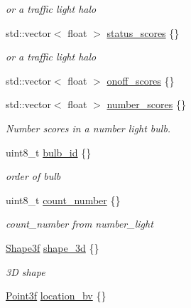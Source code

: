 \begin{DoxyCompactItemize}
\begin{DoxyCompactList}\small\item\em or a traffic light halo \end{DoxyCompactList}\item 
std\+::vector$<$ float $>$ \hyperlink{structmaf__perception__interface_1_1PhysicalTrafficLightBulb_abf4ef8170f700bb6722e8096e239b9dc}{status\+\_\+scores} \{\}
\begin{DoxyCompactList}\small\item\em or a traffic light halo \end{DoxyCompactList}\item 
std\+::vector$<$ float $>$ \hyperlink{structmaf__perception__interface_1_1PhysicalTrafficLightBulb_a59d36d09ac0295c14c669fca10392e01}{onoff\+\_\+scores} \{\}
\item 
std\+::vector$<$ float $>$ \hyperlink{structmaf__perception__interface_1_1PhysicalTrafficLightBulb_abf4959e3c9197885758daaa5683e23fc}{number\+\_\+scores} \{\}
\begin{DoxyCompactList}\small\item\em Number scores in a number light bulb. \end{DoxyCompactList}\item 
uint8\+\_\+t \hyperlink{structmaf__perception__interface_1_1PhysicalTrafficLightBulb_ac6001b8c3297400675a75010a14a1d51}{bulb\+\_\+id} \{\}
\begin{DoxyCompactList}\small\item\em order of bulb \end{DoxyCompactList}\item 
uint8\+\_\+t \hyperlink{structmaf__perception__interface_1_1PhysicalTrafficLightBulb_ab2b07679ac7b2693cad5f50850da1898}{count\+\_\+number} \{\}
\begin{DoxyCompactList}\small\item\em count\+\_\+number from number\+\_\+light \end{DoxyCompactList}\item 
\hyperlink{structmaf__perception__interface_1_1Shape3f}{Shape3f} \hyperlink{structmaf__perception__interface_1_1PhysicalTrafficLightBulb_ad2b144e77d78d35f32f8ea8e314f768c}{shape\+\_\+3d} \{\}
\begin{DoxyCompactList}\small\item\em 3D shape \end{DoxyCompactList}\item 
\hyperlink{structmaf__perception__interface_1_1Point3f}{Point3f} \hyperlink{structmaf__perception__interface_1_1PhysicalTrafficLightBulb_a21f2803692924e8161ee8e7eec318ceb}{location\+\_\+bv} \{\}

\end{DoxyCompactItemize}
